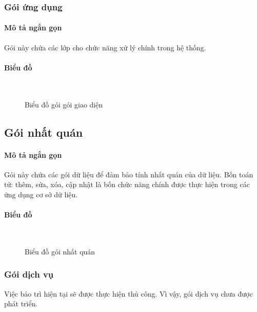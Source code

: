 \documentclass[./../main_file.tex]{subfiles}
\begin{document}
	\subsubsection{Gói ứng dụng}
	\paragraph{Mô tả ngắn gọn}
	Gói này chứa các lớp cho chức năng xử lý chính trong hệ thống.
	\paragraph{Biểu đồ}~\\
	\begin{figure}[H]
		\centering
		\resizebox{1.0\textwidth}{!}{}
		\caption{Biểu đồ gói gói giao diện}
	\end{figure}
	\subsection{Gói nhất quán}
	\paragraph{Mô tả ngắn gọn}
	Gói này chứa các gói dữ liệu để đảm bảo tính nhất quán của dữ liệu. Bốn toán tử: thêm, sửa, xóa, cập nhật là bốn chức năng chính được thực hiện trong các ứng dụng cơ sở dữ liệu.
	\paragraph{Biểu đồ}~\\
		\begin{figure}[H]
		\centering
		\resizebox{0.8\textwidth}{!}{}
		\caption{Biểu đồ gói nhất quán}
	\end{figure}
	\subsubsection{Gói dịch vụ}
	Việc bảo trì hiện tại sẽ được thực hiện thủ công. Vì vậy, gói dịch vụ chưa được phát triển.
	
	
	
\end{document}
